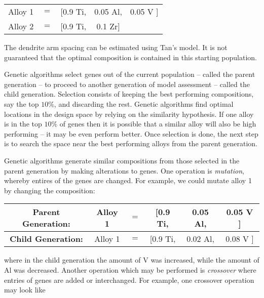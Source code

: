 \begin{table}[h!]
\begin{center}
\begin{tabular}{ccccc}
	Alloy 1 & $=$ & [0.9 Ti, & 0.05 Al, & 0.05 V ] \\
	Alloy 2 & $=$ & [0.9 Ti, & 0.1 Zr] & \\
\end{tabular}
\end{center}
\end{table}
The dendrite arm spacing can be estimated using Tan's model. It is not guaranteed that the optimal composition is contained in this starting population.

Genetic algorithms select genes out of the current population -- called the parent generation --  to proceed to another generation of model assessment -- called the child generation. Selection consists of keeping the best performing compositions, say the top $10\%$, and discarding the rest. Genetic algorithms find optimal locations in the design space by relying on the similarity hypothesis. If one alloy is in the top $10\%$ of genes then it is possible that a similar alloy will also be high performing -- it may be even perform better. Once selection is done, the next step is to search the space near the best performing alloys from the parent generation.

Genetic algorithms generate similar compositions from those selected in the parent generation by making alterations to genes. One operation is \textit{mutation}, whereby entires of the genes are changed. For example, we could mutate alloy 1 by changing the composition:

\begin{table}[h!]
\begin{center}
\begin{tabular}{c|ccccc}
	\textbf{Parent Generation:} & Alloy 1 & $=$ & [0.9 Ti, & {\color{red}0.05} Al, & {\color{red}0.05} V ] \\ \hline
	\textbf{Child Generation:} & Alloy 1 & $=$ & [0.9 Ti, & {\color{green}0.02} Al, & {\color{green}0.08} V  ]  \\ 
\end{tabular}
\end{center}
\end{table}
where in the child generation the amount of V was increased, while the amount of Al was decreased. Another operation which may be performed is \textit{crossover} where entries of genes are added or interchanged. For example, one crossover operation may look like

